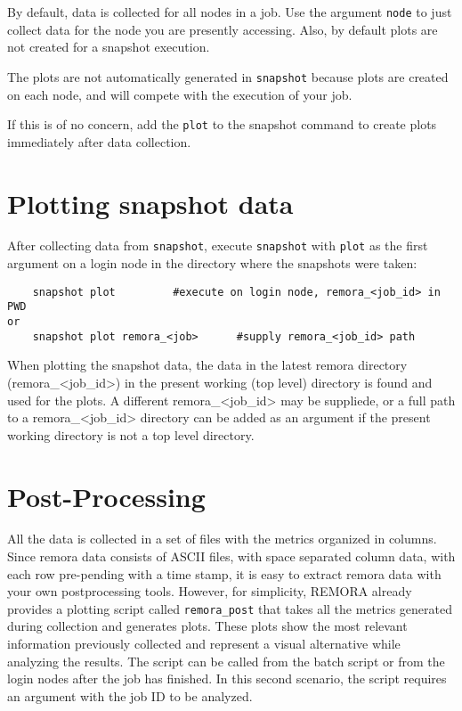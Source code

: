 \documentclass[10pt,a4paper]{report}
\begin{document}
By default, data is collected for all nodes in a job.  Use the argument \verb+node+
to just collect data for the node you are presently accessing. Also, by default
plots are not created for a snapshot execution.  

The plots are not automatically generated in \verb+snapshot+ because plots are
created on each node, and will compete with the execution of your job. 

If this is of no concern, add the \verb+plot+ to the  snapshot command to create
plots immediately after data collection.

\section{Plotting snapshot data}

After collecting data from \verb+snapshot+, execute \verb+snapshot+ with 
\verb+plot+ as the first argument on a login node in the directory where 
the snapshots were taken:

\begin{verbatim}
	snapshot plot         #execute on login node, remora_<job_id> in PWD
or
	snapshot plot remora_<job>      #supply remora_<job_id> path
\end{verbatim}

When plotting the snapshot data, the data in the latest remora directory 
(remora\_<job\_id>) in the present working (top level) directory is found and used for the plots.
A different remora\_<job\_id> may be suppliede,
or a full path to a remora\_<job\_id> directory can be added as an argument 
if the present working directory is not a top level directory.

\section{Post-Processing}
All the data is collected in a set of files with the metrics organized in columns. 
Since remora data consists of ASCII files, with space separated column data, 
with each row pre-pending with a time stamp,
it is easy to extract remora data with your own postprocessing tools. 
However, for simplicity, REMORA already provides a plotting script called 
\verb+remora_post+ that takes all the metrics generated during collection and generates plots. 
These plots show the most relevant information previously collected and 
represent a visual alternative while analyzing the results. 
The script can be called from the batch script or from the login nodes after the job has finished. 
In this second scenario, the script requires an argument with the job ID to be analyzed.
\end{document}
